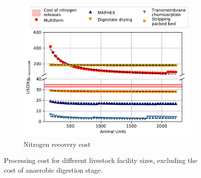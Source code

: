 \begin{refsection}[referencesApD]
\begin{figure}[h!]
	\begin{subfigure}[t]{0.7\textwidth}
		\centering
		\includegraphics[width=1\linewidth, trim={0cm 0cm 0cm 0cm},clip]{gfx/AppendixD/ScaleUp2_NoAD.pdf} 
		\caption{Nitrogen recovery cost}
		\label{fig:ScaleUp2_NoAD}
	\end{subfigure}
	
	\caption{Processing cost for different livestock facility sizes, excluding the cost of anaerobic digestion stage.} \label{fig:ScaleUGlobal_NoAD_NitrogenSP}
\end{figure}

\newpage


\end{refsection}
